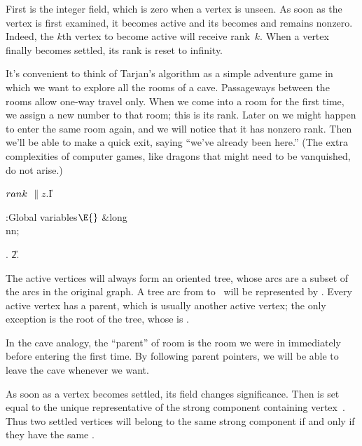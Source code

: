 \fi

First is the integer  field, which is zero when a vertex is
unseen.
As soon as the vertex is first examined, it becomes active and its 
becomes and remains nonzero. Indeed, the $k$th vertex to become active
will receive rank~$k$. When a vertex finally becomes settled, its rank
is reset to infinity.

It's convenient to think of Tarjan's algorithm as a simple adventure
game in which we want to explore all the rooms of a cave. Passageways between
the rooms allow one-way travel only. When we come
into a room for the first time, we assign a new number to that room;
this is its rank. Later on we might happen to enter the same room
again, and we will notice that it has nonzero rank. Then we'll be able
to make a quick exit, saying ``we've already been here.'' (The extra
complexities of computer games, like dragons that might need to be
vanquished, do not arise.)

\Y\B\4\D$\\{rank}$ \5
$\|z.{}$\|I\par
\Y\B\4:Global variables\X${}\E{}$\6
\&{long} \\{nn};\par
{}.
\U2.\fi

The active vertices will always form an oriented tree, whose arcs are
a subset of the arcs in the original graph. A tree arc from  to~
will be represented by . Every active vertex has a
parent, which is usually another active vertex; the only exception is
the root of the tree, whose  is \PB{$\NULL$}.

In the cave analogy, the ``parent'' of room  is the room we were in
immediately before entering  the first time. By following parent
pointers, we will be able to leave the cave whenever we want.

As soon as a vertex becomes settled, its  field changes
significance.  Then  is set equal to the unique
representative of the strong component containing vertex~. Thus
two settled vertices will belong to the same strong component if and only
if they have the same .

